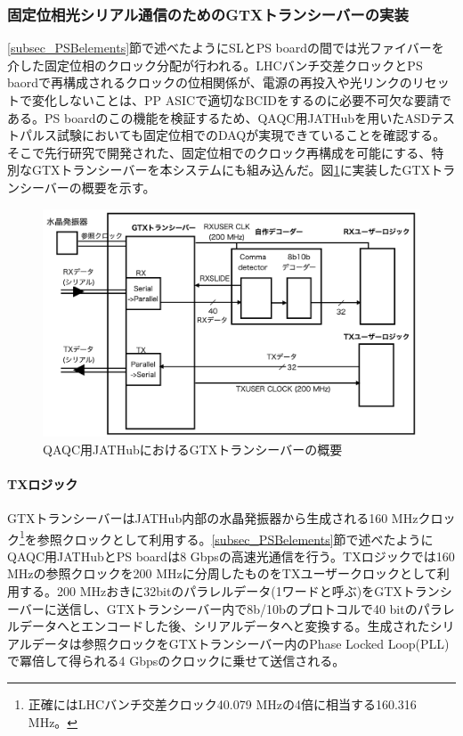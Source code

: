 \subsubsection{固定位相光シリアル通信のためのGTXトランシーバーの実装}
\baselineskip
\label{subsubsec_gtx}
\ref{subsec_PSBelements}節で述べたようにSLとPS boardの間では光ファイバーを介した固定位相のクロック分配が行われる。LHCバンチ交差クロックとPS baordで再構成されるクロックの位相関係が、電源の再投入や光リンクのリセットで変化しないことは、PP ASICで適切なBCIDをするのに必要不可欠な要請である。PS boardのこの機能を検証するため、QAQC用JATHubを用いたASDテストパルス試験においても固定位相でのDAQが実現できていることを確認する。そこで先行研究\cite{mt_aoki}で開発された、固定位相でのクロック再構成を可能にする、特別なGTXトランシーバーを本システムにも組み込んだ。図\ref{JATHubgtx}に実装したGTXトランシーバーの概要を示す。
\baselineskip

\begin{figure} 
\centering
\includegraphics[width=16cm]{fig/QAQC/JATHubgtx.png}
\caption[QAQC用JATHubにおけるGTXトランシーバーの概要]{QAQC用JATHubにおけるGTXトランシーバーの概要}
\label{JATHubgtx}
\end{figure}


\paragraph{TXロジック} \par
GTXトランシーバーはJATHub内部の水晶発振器から生成される160 MHzクロック\footnote{正確にはLHCバンチ交差クロック40.079 MHzの4倍に相当する160.316 MHz。}を参照クロックとして利用する。\ref{subsec_PSBelements}節で述べたようにQAQC用JATHubとPS boardは8 Gbpsの高速光通信を行う。TXロジックでは160 MHzの参照クロックを200 MHzに分周したものをTXユーザークロックとして利用する。200 MHzおきに32bitのパラレルデータ(1ワードと呼ぶ)をGTXトランシーバーに送信し、GTXトランシーバー内で8b/10bのプロトコルで40 bitのパラレルデータへとエンコードした後、シリアルデータへと変換する。生成されたシリアルデータは参照クロックをGTXトランシーバー内のPhase Locked Loop(PLL)で冪倍して得られる4 Gbpsのクロックに乗せて送信される。
\baselineskip

